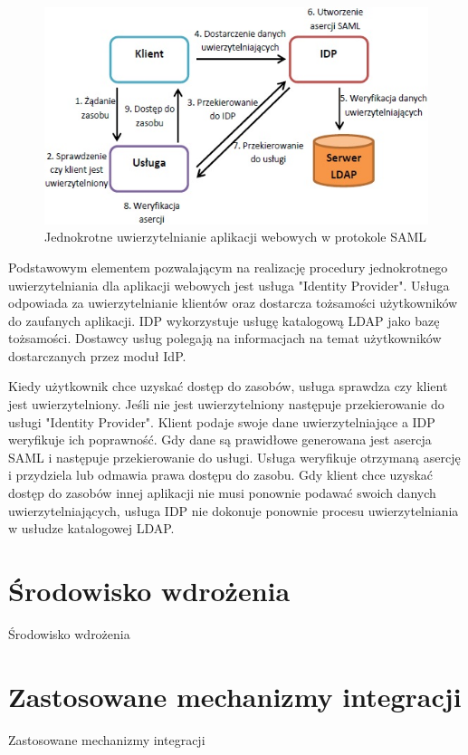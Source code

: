 		\begin{figure}[h]
			\centering
			\includegraphics{img/samlWebSSO.jpg}
			\caption{Jednokrotne uwierzytelnianie aplikacji webowych w protokole SAML}
			\label{Jednokrotne uwierzytelnianie aplikacji webowych w protokole SAML}
		\end{figure}

		Podstawowym elementem pozwalającym na realizację procedury jednokrotnego uwierzytelniania dla aplikacji webowych jest usługa "Identity Provider". Usługa odpowiada za uwierzytelnianie klientów oraz dostarcza tożsamości użytkowników do zaufanych aplikacji. IDP wykorzystuje usługę katalogową LDAP jako bazę tożsamości. Dostawcy usług polegają na informacjach na temat użytkowników dostarczanych przez moduł IdP. 

		Kiedy użytkownik chce uzyskać dostęp do zasobów, usługa sprawdza czy klient jest uwierzytelniony. Jeśli nie jest uwierzytelniony następuje przekierowanie do usługi "Identity Provider". Klient podaje swoje dane uwierzytelniające a IDP weryfikuje ich poprawność. Gdy dane są prawidłowe generowana jest asercja SAML i następuje przekierowanie do usługi. Usługa weryfikuje otrzymaną asercję i przydziela lub odmawia prawa dostępu do zasobu. Gdy klient chce uzyskać dostęp do zasobów innej aplikacji nie musi ponownie podawać swoich danych uwierzytelniających, usługa IDP nie dokonuje ponownie procesu uwierzytelniania w usłudze katalogowej LDAP.


\section{Środowisko wdrożenia}
\label{sec:srodowiskoWdrozenia}

Środowisko wdrożenia


\section{Zastosowane mechanizmy integracji}
\label{sec:integracja}

Zastosowane mechanizmy integracji

